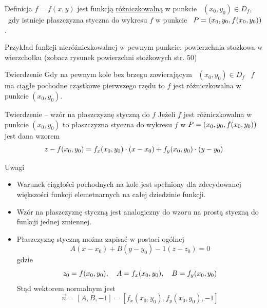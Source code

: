 \begin{tw}{Definicja}
$ f = f(x,y) $ jest funkcją \underline{różniczkowalną} w punkcie \ $(x_0, y_0) \in D_f$, \ gdy istnieje płaszczyzna styczna do wykresu $f$
w punkcie \ $ P = (x_0, y_0, f(x_0, y_0)) $.
\end{tw}

Przykład funkcji nieróżniczkowalnej w pewnym punkcie: powierzchnia stożkowa w wierzchołku (zobacz rysunek powierzchni stożkowych str. 50)

\begin{tw}{Twierdzenie}
Gdy na pewnym kole bez brzegu zawierającym \ $(x_0, y_0) \in D_f $ \ $f$ ma ciągłe pochodne cząstkowe pierwszego rzędu to $f$ jest różniczkowalna w punkcie $(x_0, y_0)$.
\end{tw}

\begin{tw}{Twierdzenie -- wzór na płaszczyznę styczną do $f$}
    Jeżeli $f$ jest różniczkowalna w punkcie $(x_0, y_0)$ to płaszczyzna styczna do wykresu $f$ w $P = (x_0, y_0, f(x_0, y_0))$ jest dana wzorem
    \[ z - f(x_0, y_0) = f_x(x_0, y_0) \cdot (x - x_0) + f_y(x_0, y_0) \cdot (y - y_0) \]
\end{tw}

Uwagi 
\begin{itemize}
    \item Warunek ciągłości pochodnych na kole jest spełniony dla zdecydowanej większości funkcji elemetnarnych na całej dziedzinie funkcji.
    \item Wzór na płaszczyznę styczną jest analogiczny do wzoru na prostą styczną do funkcji jednej zmiennej.
    \item Płaszczyznę styczną można zapisać w postaci ogólnej
    \[ A(x - x_0) + B(y - y_0) - 1(z - z_0) = 0 \]
    gdzie
    \[ z_0 = f(x_0, y_0), \quad A = f_x(x_0, y_0), \quad B = f_y(x_0, y_0) \]
    Stąd wektorem normalnym jest
    \[ \vec{n} = [A, B, -1] = [f_x(x_0, y_0), f_y(x_0, y_0), -1] \] 
\end{itemize}

